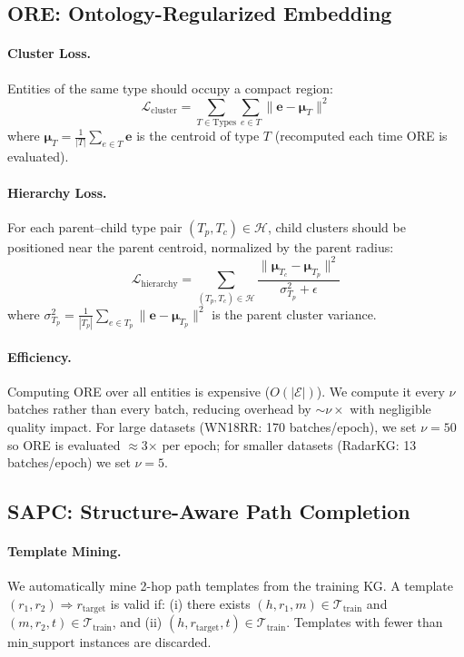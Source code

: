 \documentclass[10pt,twocolumn]{article}
\begin{document}
\subsection{ORE: Ontology-Regularized Embedding}

\paragraph{Cluster Loss.}
Entities of the same type should occupy a compact region:
\[
  \mathcal{L}_{\text{cluster}} = \sum_{T \in \text{Types}}
  \sum_{e \in T} \| \mathbf{e} - \boldsymbol{\mu}_T \|^2
\]
where $\boldsymbol{\mu}_T = \frac{1}{|T|}\sum_{e \in T} \mathbf{e}$ is the centroid
of type $T$ (recomputed each time ORE is evaluated).

\paragraph{Hierarchy Loss.}
For each parent--child type pair $(T_p, T_c) \in \mathcal{H}$, child clusters
should be positioned near the parent centroid, normalized by the parent radius:
\[
  \mathcal{L}_{\text{hierarchy}} = \sum_{(T_p, T_c) \in \mathcal{H}}
  \frac{\| \boldsymbol{\mu}_{T_c} - \boldsymbol{\mu}_{T_p} \|^2}
       {\sigma_{T_p}^2 + \epsilon}
\]
where $\sigma_{T_p}^2 = \frac{1}{|T_p|}\sum_{e \in T_p} \|\mathbf{e}-\boldsymbol{\mu}_{T_p}\|^2$
is the parent cluster variance.

\paragraph{Efficiency.}
Computing ORE over all entities is expensive ($O(|\mathcal{E}|)$). We compute it
every $\nu$ batches rather than every batch, reducing overhead
by $\sim$$\nu\times$ with negligible quality impact.
For large datasets (WN18RR: 170 batches/epoch), we set $\nu=50$
so ORE is evaluated $\approx$3$\times$ per epoch; for smaller datasets (RadarKG:
13 batches/epoch) we set $\nu=5$.

\subsection{SAPC: Structure-Aware Path Completion}

\paragraph{Template Mining.}
We automatically mine 2-hop path templates from the training KG. A template
$(r_1, r_2) \Rightarrow r_{\text{target}}$ is valid if:
(i) there exists $(h, r_1, m) \in \mathcal{T}_{\text{train}}$ and
$(m, r_2, t) \in \mathcal{T}_{\text{train}}$, and
(ii) $(h, r_{\text{target}}, t) \in \mathcal{T}_{\text{train}}$.
Templates with fewer than $\text{min\_support}$ instances are discarded.
\end{document}
